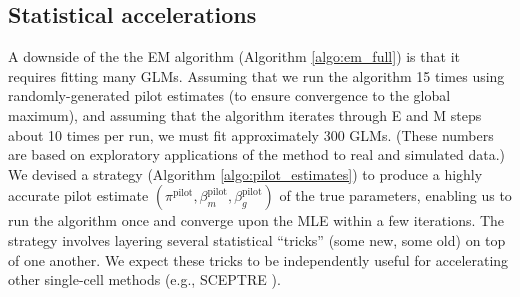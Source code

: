 \documentclass[12pt]{article}
\begin{document}
\subsection{Statistical accelerations}
A downside of the the EM algorithm (Algorithm \ref{algo:em_full}) is that it requires fitting many GLMs. Assuming that we run the algorithm 15 times using randomly-generated pilot estimates (to ensure convergence to the global maximum), and assuming that the algorithm iterates through E and M steps about 10 times per run, we must fit approximately 300 GLMs. (These numbers are based on exploratory applications of the method to real and simulated data.) We devised a strategy (Algorithm \ref{algo:pilot_estimates}) to produce a highly accurate pilot estimate $(\pi^\textrm{pilot}, \beta_m^\textrm{pilot}, \beta_g^\textrm{pilot})$ of the true parameters, enabling us to run the algorithm once and converge upon the MLE within a few iterations. The strategy involves layering several statistical ``tricks'' (some new, some old) on top of one another. We expect these tricks to be independently useful for accelerating other single-cell methods (e.g., SCEPTRE \cite{Barry2020}).
\end{document}

